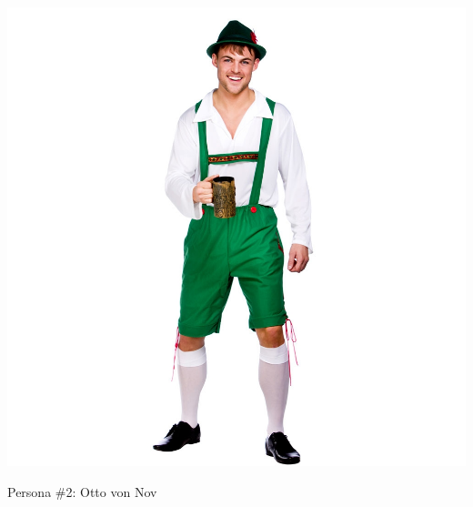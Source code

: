 \documentclass{sigchi-ext}
\begin{document}
\begin{marginfigure}[1pc]
  \begin{minipage}{\marginparwidth}
    \centering
  \includegraphics[width=0.9\marginparwidth]{figures/otto.png}
    \caption{Persona \#2: Otto von Nov }~\label{fig:marginfig}
  \end{minipage}
\end{marginfigure}
\end{document}
